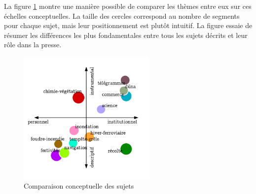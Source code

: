 \documentclass[a4paper,twoside,12pt]{article}
\begin{document}
La figure \ref{fig:conceptual_scatterplot} montre une manière possible de comparer les thèmes entre eux sur ces échelles conceptuelles. La taille des cercles correspond au nombre de segments pour chaque sujet, mais leur positionnement est plutôt intuitif. La figure essaie de résumer les différences les plus fondamentales entre tous les sujets décrits et leur rôle dans la presse.

\begin{figure}
  \begin{center}
    \includegraphics[width=0.6\textwidth, frame]{images/conceptual_scatterplot2.pdf}
  \end{center}
  \vspace*{-2ex}
  \captionsetup{justification=centering}
  \caption{Comparaison conceptuelle des sujets}
  \label{fig:conceptual_scatterplot}
\end{figure}
\end{document}
